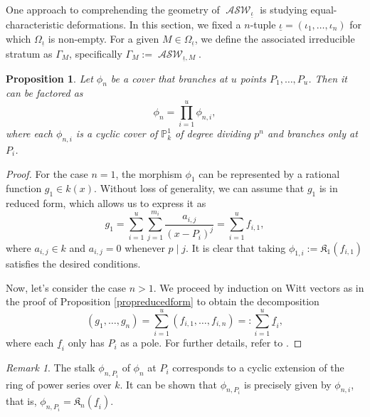 \documentclass{compositio}
\newtheorem{proposition}[theorem]{Proposition}
\theoremstyle{remark}
\theoremstyle{remark}
\newtheorem{remark}[theorem]{Remark}
\DeclareMathOperator{\ASW}{\mathcal{ASW}}
\begin{document}
One approach to comprehending the geometry of $\ASW_{\underline{\iota}}$ is studying equal-characteristic deformations. In this section, we fixed a $n$-tuple $\underline{\iota}=(\iota_1, \ldots, \iota_n)$ for which $\Omega_{\underline{\iota}}$ is non-empty. For a given $M \in \Omega_{\underline{\iota}}$, we define the associated irreducible stratum as $\Gamma_M$, specifically $\Gamma_M:=\ASW_{\underline{\iota},M}$.



\begin{proposition}
Let $\phi_n$ be a cover that branches at $u$ points $P_1, \ldots, P_u$. Then it can be factored as
\begin{equation*}
\phi_n = \prod_{i=1}^u \phi_{n,i},
\end{equation*}
where each $\phi_{n,i}$ is a cyclic cover of $\mathbb{P}^1_k$ of degree dividing $p^n$ and branches only at $P_i$.
\end{proposition}

\begin{proof}
    For the case $n=1$, the morphism $\phi_1$ can be represented by a rational function $g_1 \in k(x)$. Without loss of generality, we can assume that $g_1$ is in reduced form, which allows us to express it as
\begin{equation*}
g_1 = \sum_{i=1}^u \sum_{j=1}^{m_i} \frac{a_{i,j}}{(x-P_i)^j} = \sum_{i=1}^u f_{i,1},
\end{equation*}
where $a_{i,j} \in k$ and $a_{i,j}=0$ whenever $p \mid j$. It is clear that taking $\phi_{1,i}:=\mathfrak{K}_1(f_{i,1})$ satisfies the desired conditions. 

Now, let's consider the case $n>1$. We proceed by induction on Witt vectors as in the proof of Proposition \ref{propreducedform} to obtain the decomposition
\begin{equation*}
    (g_1, \ldots, g_n) = \sum_{i=1}^u (f_{i,1}, \ldots, f_{i,n}) =: \sum_{i=1}^u \underline{f}_i,
\end{equation*}
where each $\underline{f}_i$ only has $P_i$ as a pole. For further details, refer to \cite[Proposition 5.1]{2020arXiv201013614D}.
\end{proof}


\begin{remark}
The stalk $\phi_{n,P_i}$ of $\phi_n$ at $P_i$ corresponds to a cyclic extension of the ring of power series over $k$. It can be shown that $\phi_{n,P_i}$ is precisely given by $\phi_{n,i}$, that is, $\phi_{n,P_i}=\mathfrak{K}_n(\underline{f}_i)$.
\end{remark}
\end{document}
